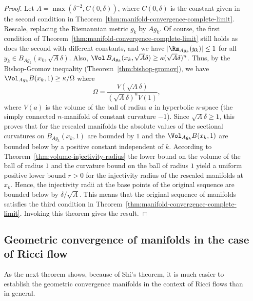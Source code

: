 \begin{proof}
\sketch
{}
Let $A=\max(\delta^{-2},C(0,\delta))$, where $C(0,\delta)$ is the constant
given in the second condition in Theorem~\ref{thm:manifold-convergence-complete-limit}. Rescale, replacing the
Riemannian metric $g_k$ by $Ag_k$. Of course, the first condition of
Theorem~\ref{thm:manifold-convergence-complete-limit} still holds as does the second with different constants,
and we have $\left|\Rm_{Ag_k}(y_k)\right|\le 1$ for all $y_k\in
B_{Ag_k}(x_k,\sqrt{A}\delta)$. Also, $\Vol\,B_{Ag_k}(x_k,\sqrt{A}\delta)\ge \kappa (\sqrt{A}\delta)^n$. Thus, by the
Bishop-Gromov inequality (Theorem~\ref{thm:bishop-gromov}), we have $\Vol_{Ag_k}B(x_k,1)\ge \kappa/\Omega$ where
$$\Omega=\frac{V(\sqrt{A}\delta)}{(\sqrt{A}\delta)^nV(1)},$$
where $V(a)$ is the volume of the ball of radius $a$ in hyperbolic
$n$-space (the simply connected $n$-manifold of constant curvature
$-1$).
 Since
$\sqrt{A}\delta\ge 1$, this proves that for the rescaled manifolds the absolute
values of the sectional curvatures on $B_{Ag_k}(x_k,1)$ are bounded by $1$ and
the $\Vol_{Ag_k}B(x_k,1)$ are bounded below by a positive constant
independent of $k$.
 According to Theorem~\ref{thm:volume-injectivity-radius} the lower bound on the volume of the ball
of radius $1$ and the curvature bound on the ball of radius $1$ yield a uniform
positive lower bound $r>0$ for the injectivity radius of the rescaled manifolds
at $x_k$. Hence, the injectivity radii at the base points of the original
sequence are bounded below by $\delta/\sqrt{A}$. This means that the original
sequence of manifolds satisfies the third condition in Theorem~\ref{thm:manifold-convergence-complete-limit}.
Invoking this theorem gives the result.
\end{proof}


\subsection{Geometric convergence of manifolds in the case of Ricci
flow}

As the next theorem shows, because of Shi's theorem, it is much
easier to establish the geometric convergence manifolds in the
context of Ricci flows than in general.




